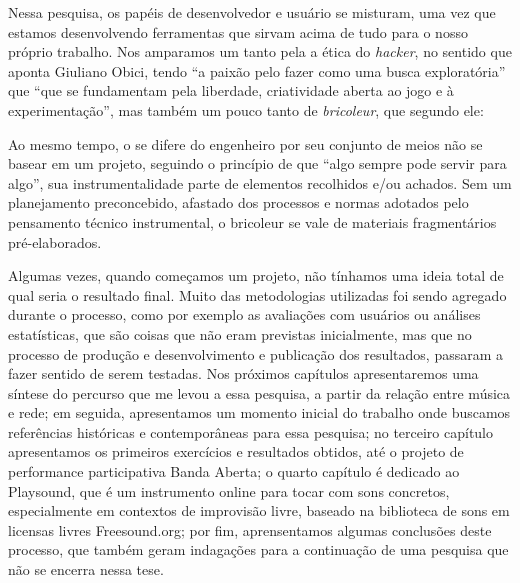{%



Nessa pesquisa, os papéis de desenvolvedor e usuário se misturam, uma vez que estamos desenvolvendo ferramentas que sirvam acima de tudo para o nosso próprio trabalho. Nos amparamos um tanto pela a ética do \emph{hacker}, no sentido que aponta Giuliano Obici, tendo ``a paixão pelo fazer como uma busca exploratória'' que ``que se fundamentam pela liberdade, criatividade aberta ao jogo e à experimentação''\cite[366]{Obici2014}, mas também um pouco tanto de \emph{bricoleur}, que segundo ele:
\begin{citacao}
Ao mesmo tempo, o  se difere do engenheiro por seu conjunto de meios não se basear em um projeto, seguindo o princípio de que “algo sempre pode servir para algo”, sua instrumentalidade parte de elementos recolhidos e/ou achados. Sem um planejamento preconcebido, afastado dos processos e normas adotados pelo pensamento técnico instrumental, o bricoleur se vale de materiais fragmentários pré-elaborados. \cite[366]{Obici2014}
\end{citacao}

Algumas vezes, quando começamos um projeto, não tínhamos uma ideia total de qual seria o resultado final. Muito das metodologias utilizadas foi sendo agregado durante o processo, como por exemplo as avaliações com usuários ou análises estatísticas, que são coisas que não eram previstas inicialmente, mas que no processo de produção e desenvolvimento e publicação dos resultados, passaram a fazer sentido de serem testadas. Nos próximos capítulos apresentaremos uma síntese do percurso que me levou a essa pesquisa, a partir da relação entre música e rede; em seguida, apresentamos um momento inicial do trabalho onde buscamos referências históricas e contemporâneas para essa pesquisa; no terceiro capítulo apresentamos os primeiros exercícios e resultados obtidos, até o projeto de performance participativa Banda Aberta; o quarto capítulo é dedicado ao Playsound, que é um instrumento online para tocar com sons concretos, especialmente em contextos de improvisão livre, baseado na biblioteca de sons em licensas livres Freesound.org; por fim, aprensentamos algumas conclusões deste processo, que também geram indagações para a continuação de uma pesquisa que não se encerra nessa tese.






}
